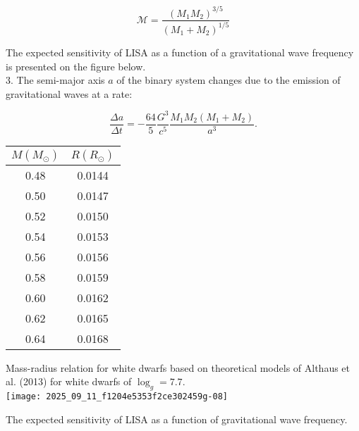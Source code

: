 \documentclass[10pt]{article}
\begin{document}
$$
\mathcal{M}=\frac{\left(M_{1} M_{2}\right)^{3 / 5}}{\left(M_{1}+M_{2}\right)^{1 / 5}}
$$

The expected sensitivity of LISA as a function of a gravitational wave frequency is presented on the figure below.\\
3. The semi-major axis $a$ of the binary system changes due to the emission of gravitational waves at a rate:

$$
\frac{\Delta a}{\Delta t}=-\frac{64}{5} \frac{G^{3}}{c^{5}} \frac{M_{1} M_{2}\left(M_{1}+M_{2}\right)}{a^{3}} .
$$

\begin{center}
\begin{tabular}{cc}
\hline\hline
$M\left(M_{\odot}\right)$ & $R\left(R_{\odot}\right)$ \\
\hline
0.48 & 0.0144 \\
0.50 & 0.0147 \\
0.52 & 0.0150 \\
0.54 & 0.0153 \\
0.56 & 0.0156 \\
0.58 & 0.0159 \\
0.60 & 0.0162 \\
0.62 & 0.0165 \\
0.64 & 0.0168 \\
\hline
\end{tabular}
\end{center}

Mass-radius relation for white dwarfs based on theoretical models of Althaus et al. (2013) for white dwarfs of $\log _{g}=7.7$.\\
\texttt{[image: 2025\_09\_11\_f1204e5353f2ce302459g-08]}

The expected sensitivity of LISA as a function of gravitational wave frequency.
\end{document}

